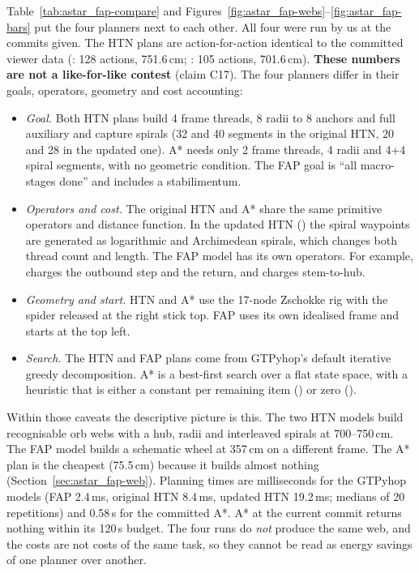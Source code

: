 Table~\ref{tab:astar_fap-compare} and Figures~\ref{fig:astar_fap-webs}--\ref{fig:astar_fap-bars} put
the four planners next to each other. All four were run by us at the commits given. The HTN plans
are action-for-action identical to the committed viewer data (: 128
actions, 751.6\,cm; : 105 actions, 701.6\,cm). \textbf{These numbers
are not a like-for-like contest} (claim C17). The four planners differ in their goals, operators,
geometry and cost accounting:
\begin{itemize}
  \item \emph{Goal.} Both HTN plans build 4 frame threads, 8 radii to 8 anchors and full auxiliary
  and capture spirals (32 and 40 segments in the original HTN, 20 and 28 in the updated one). A*
  needs only 2 frame threads, 4 radii and 4+4 spiral segments, with no geometric condition. The FAP
  goal is ``all macro-stages done'' and includes a stabilimentum.
  \item \emph{Operators and cost.} The original HTN and A* share the same primitive operators and
  distance function. In the updated HTN () the spiral waypoints are generated as
  logarithmic and Archimedean spirals, which changes both thread count and length. The FAP model
  has its own operators. For example,  charges the outbound step and the
  return, and  charges stem-to-hub.
  \item \emph{Geometry and start.} HTN and A* use the 17-node Zschokke rig with the spider released
  at the right stick top. FAP uses its own idealised frame and starts at the top left.
  \item \emph{Search.} The HTN and FAP plans come from GTPyhop's default iterative greedy
  decomposition. A* is a best-first search over a flat state space, with a heuristic that is
  either a constant per remaining item () or zero ().
\end{itemize}
Within those caveats the descriptive picture is this. The two HTN models build recognisable orb
webs with a hub, radii and interleaved spirals at 700--750\,cm. The FAP model builds a schematic
wheel at 357\,cm on a different frame. The A* plan is the cheapest (75.5\,cm) because it builds
almost nothing (Section~\ref{sec:astar_fap-web}). Planning times are milliseconds for the GTPyhop
models (FAP 2.4\,ms, original HTN 8.4\,ms, updated HTN 19.2\,ms; medians of 20 repetitions) and
0.58\,s for the committed A*. A* at the current commit returns nothing within its 120\,s budget.
The four runs do \emph{not} produce the same web, and the costs are not costs of the same task, so
they cannot be read as energy savings of one planner over another.

